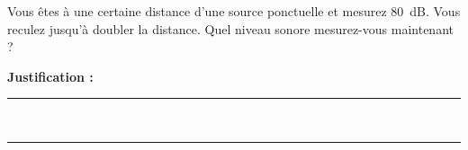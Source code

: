 Vous êtes à une certaine distance d'une source ponctuelle et mesurez \qty{80}{dB}. Vous reculez jusqu'à doubler la distance. Quel niveau sonore mesurez-vous maintenant ?

\choices

\noindent\textbf{Justification :} \hrulefill \\[2.5ex]
\rule{\linewidth}{0.4pt} \\[2.5ex]
\rule{\linewidth}{0.4pt}
\vfill
